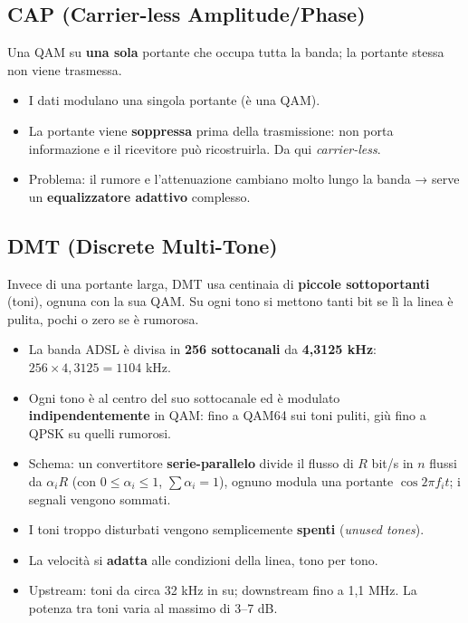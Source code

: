 \subsection{CAP (Carrier-less Amplitude/Phase)}

\begin{inbreve}

Una QAM su \textbf{una sola} portante che occupa tutta la banda; la portante stessa non viene trasmessa.

\end{inbreve}

\begin{itemize}
\tightlist
\item
  I dati modulano una singola portante (è una QAM).
\item
  La portante viene \textbf{soppressa} prima della trasmissione: non porta informazione e il ricevitore può ricostruirla. Da qui \emph{carrier-less}.
\item
  Problema: il rumore e l'attenuazione cambiano molto lungo la banda → serve un \textbf{equalizzatore adattivo} complesso.
\end{itemize}

\subsection{DMT (Discrete Multi-Tone)}

\begin{inbreve}

Invece di una portante larga, DMT usa centinaia di \textbf{piccole sottoportanti} (toni), ognuna con la sua QAM. Su ogni tono si mettono tanti bit se lì la linea è pulita, pochi o zero se è rumorosa.

\end{inbreve}

\begin{itemize}
\tightlist
\item
  La banda ADSL è divisa in \textbf{256 sottocanali} da \textbf{4,3125 kHz}: \(256 \times 4{,}3125 = 1104\) kHz.
\item
  Ogni tono è al centro del suo sottocanale ed è modulato \textbf{indipendentemente} in QAM: fino a QAM64 sui toni puliti, giù fino a QPSK su quelli rumorosi.
\item
  Schema: un convertitore \textbf{serie-parallelo} divide il flusso di \(R\) bit/s in \(n\) flussi da \(\alpha_i R\) (con \(0 \le \alpha_i \le 1\), \(\sum \alpha_i = 1\)), ognuno modula una portante \(\cos 2\pi f_i t\); i segnali vengono sommati.
\item
  I toni troppo disturbati vengono semplicemente \textbf{spenti} (\emph{unused tones}).
\item
  La velocità si \textbf{adatta} alle condizioni della linea, tono per tono.
\item
  Upstream: toni da circa 32 kHz in su; downstream fino a 1,1 MHz. La potenza tra toni varia al massimo di 3--7 dB.
\end{itemize}

